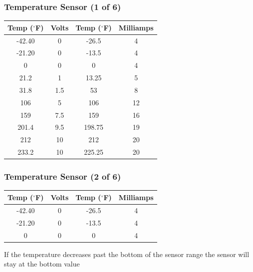 \begin{frame}
    \frametitle{Temperature Sensor (1 of 6)}

    \begin{table}
        \centering
        \begin{tabular}{|c|c|c|c|}
            \hline
            Temp ($^\circ$F) & Volts & Temp ($^\circ$F) & Milliamps\\
            \hline
             -42.40 & 0 & -26.5 & 4\\
             \hline
             -21.20 & 0 & -13.5 & 4\\
             \hline
             \hline
             0 & 0 & 0 & 4\\
             \hline
             21.2 & 1 & 13.25 & 5\\
             \hline
             31.8 & 1.5 & 53 & 8\\
             \hline
             106 & 5 & 106 & 12\\
             \hline
             159 & 7.5 & 159 & 16\\
             \hline
             201.4 & 9.5 & 198.75 & 19\\
             \hline
             212 & 10 & 212 & 20\\
             \hline
             \hline
             233.2 & 10 & 225.25 & 20\\
             \hline
        \end{tabular}
    \end{table}
\end{frame}

\begin{frame}
    \frametitle{Temperature Sensor (2 of 6)}

    \begin{table}
        \centering
        \begin{tabular}{|c|c|c|c|}
            \hline
            Temp ($^\circ$F) & Volts & Temp ($^\circ$F) & Milliamps\\
            \hline
             -42.40 & 0 & -26.5 & 4\\
             \hline
             -21.20 & 0 & -13.5 & 4\\
             \hline
             \hline
             0 & 0 & 0 & 4\\
             \hline
        \end{tabular}
    \end{table}

    \vspace{1em}
    \centering
    {\footnotesize If the temperature decreases past the bottom of the sensor range the sensor will stay at the bottom value\par}
\end{frame}

